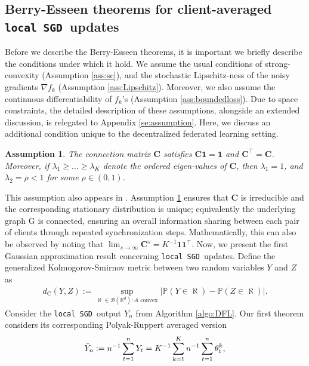 \documentclass[a4paper,11pt]{article}
\numberwithin{equation}{section}
\theoremstyle{plain}
\newtheorem{assumption}{Assumption}[section]
\theoremstyle{remark}
\def\R{\mathbb{R}}
\def\bo{\mathbf{1}}
\def\bC{\mathbf{C}}
\newcommand{\DFL}{\texttt{local SGD}}
\newcommand{\IP}{\mathbb{P}}
\begin{document}
\subsection{Berry-Esseen theorems for client-averaged \DFL\ updates}\label{se:berry-esseen-thm}
Before we describe the Berry-Esseen theorems, it is important we briefly describe the conditions under which it hold. We assume the usual conditions of strong-convexity (Assumption \ref{ass:sc}), and the stochastic Lipschitz-ness of the noisy gradients $\nabla f_k$ (Assumption \ref{ass:Lipschitz}). Moreover, we also assume the continuous differentiability of $f_k$'s (Assumption \ref{ass:boundedloss}). Due to space constraints, the detailed description of these assumptions, alongside an extended discussion, is relegated to Appendix \ref{se:assumption}. Here, we discuss an additional condition unique to the decentralized federated learning setting.
\begin{assumption}\label{ass:sync}
    The connection matrix $\bC$ satisfies $\bC \mathbf{1}=\mathbf{1}$ and $\bC^\top=\bC$. Moreover, if $\lambda_1\geq \ldots \geq \lambda_K$ denote the ordered eigen-values of $\bC$, then $\lambda_1=1$, and $\lambda_2 = \rho <1$ for some $\rho \in (0,1)$.
\end{assumption}
This assumption also appears in \cite{songxichen2024}. Assumption \ref{ass:sync} ensures that $\bC$ is irreducible and the corresponding stationary distribution is unique; equivalently the underlying graph $\mathrm{G}$ is connected, ensuring an overall information sharing between each pair of clients through repeated synchronization steps. Mathematically, this can also be observed by noting that $\lim_{s \to \infty} \bC^s = K^{-1}\bo\bo^\top$. 
Now, we present the first Gaussian approximation result concerning \DFL\ updates. Define the generalized Kolmogorov-Smirnov metric between two random variables $Y$ and $Z$ as 
\begin{align} \label{eq:kolmogorov}
    d_{\mathrm{C}}(Y,Z):= \sup_{\aleph \in \mathcal{B}(\R^d): A \text{ convex}}\big|\IP(Y \in \aleph)- \IP(Z \in \aleph) \big|.
\end{align}
Consider the \DFL\ output $Y_n$ from Algorithm \ref{algo:DFL}. Our first theorem considers its corresponding Polyak-Ruppert averaged version 
\begin{align} \label{eq:Y_bar_defn}
    \Bar{Y}_n:= n^{-1}\sum_{t=1}^n Y_t = K^{-1} \sum_{k=1}^K n^{-1}\sum_{t=1}^n \theta_t^k,
\end{align}
\end{document}
